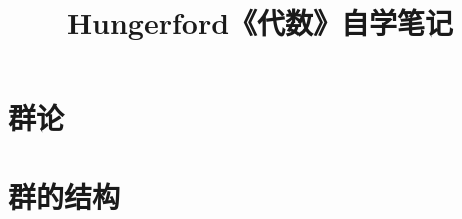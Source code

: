 \documentclass[11pt,fontset=fandol,scheme=plain]{ctexart}
\title{Hungerford《代数》自学笔记}
\author{}
\date{}
\theoremstyle{notes}
\begin{document}
\maketitle

\section{群论}











\section{群的结构}












\end{document}
